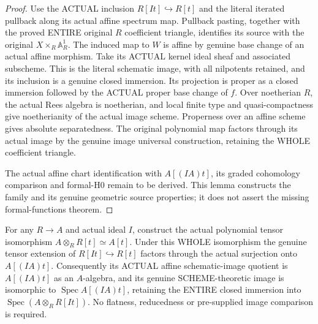 \begin{proof}
Use the ACTUAL inclusion $R[It]\hookrightarrow R[t]$ and the literal iterated pullback along
its actual affine spectrum map. Pullback pasting, together with the proved ENTIRE original
$R$ coefficient triangle, identifies its source with the original $X\times_R\mathbb A^1_R$.
The induced map to $W$ is affine by genuine base change of an actual affine morphism.
Take its ACTUAL kernel ideal sheaf and associated subscheme. This is the literal schematic
image, with all nilpotents retained, and its inclusion is a genuine closed immersion.
Its projection is proper as a closed immersion followed by the ACTUAL proper base change
of $f$. Over noetherian $R$, the actual Rees algebra is noetherian, and local finite type and
quasi-compactness give noetherianity of the actual image scheme. Properness over an affine
scheme gives absolute separatedness. The original polynomial map factors through its actual
image by the genuine image universal construction, retaining the WHOLE coefficient triangle.

The actual affine chart identification with $A[(IA)t]$, its graded cohomology comparison and
formal-H0 remain to be derived. This lemma constructs the family and its genuine geometric
source properties; it does not assert the missing formal-functions theorem.
\end{proof}

\begin{lemma}\label{lem:fc-rees-formal-affine}
\leanok
{}
For any $R\to A$ and actual ideal $I$, construct the actual polynomial tensor isomorphism
$A\otimes_R R[t]\simeq A[t]$. Under this WHOLE isomorphism the genuine tensor extension of
$R[It]\hookrightarrow R[t]$ factors through the actual surjection onto $A[(IA)t]$.
Consequently its ACTUAL affine schematic-image quotient is $A[(IA)t]$ as an $A$-algebra,
and its genuine SCHEME-theoretic image is isomorphic to $\operatorname{Spec}A[(IA)t]$,
retaining the ENTIRE closed immersion into $\operatorname{Spec}(A\otimes_R R[It])$.
No flatness, reducedness or pre-supplied image comparison is required.
\end{lemma}

